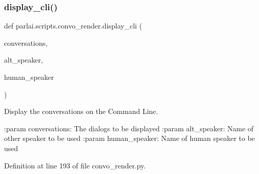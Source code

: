 \mbox{\label{namespaceparlai_1_1scripts_1_1convo__render_a68e7e186a59ac2397560d0107f804ff3}} 
\subsubsection{\texorpdfstring{display\+\_\+cli()}{display\_cli()}}
{\footnotesize\ttfamily def parlai.\+scripts.\+convo\+\_\+render.\+display\+\_\+cli (\begin{DoxyParamCaption}\item[{}]{conversations,  }\item[{}]{alt\+\_\+speaker,  }\item[{}]{human\+\_\+speaker }\end{DoxyParamCaption})}

\begin{DoxyVerb}Display the conversations on the Command Line.

:param conversations: The dialogs to be displayed
:param alt_speaker: Name of other speaker to be used
:param human_speaker: Name of human speaker to be used
\end{DoxyVerb}
 

Definition at line 193 of file convo\+\_\+render.\+py.



